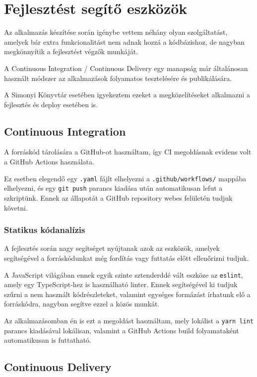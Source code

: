 \chapter{Fejlesztést segítő eszközök}

Az alkalmazás készítése során igénybe vettem néhány olyan szolgáltatást, amelyek bár extra funkcionalitást nem adnak hozzá a kódbázishoz,
de nagyban megkönnyítik a fejlesztést végzők munkáját.

A Continuous Integration / Continuous Delivery egy manapság már általánosan használt módszer az alkalmazások folyamatos tesztelésére és publikálására.

A Simonyi Könyvtár esetében igyekeztem ezeket a megközelítéseket alkalmazni a fejlesztés és deploy esetében is.

\section{Continuous Integration}

A forráskód tárolására a GitHub-ot használtam, így CI megoldásnak evidens volt a GitHub Actions használata.

Ez esetben elegendő egy \lstinline|.yaml| fájlt elhelyezni a \lstinline|.github/workflows/| mappába elhelyezni, és egy \lstinline|git push|
parancs kiadása után automatikusan lefut a szkriptünk. Ennek az állapotát a GitHub repository webes felületén tudjuk követni.

\subsection{Statikus kódanalízis}

A fejlesztés során nagy segítséget nyújtanak azok az eszközök, amelyek segítségével a forráskódunkat még fordítás vagy futtatás
előtt ellenőrizni tudjuk.

A JavaScript világában ennek egyik szinte sztenderddé vált eszköze az \lstinline|eslint|, amely egy TypeScript-hez is használható linter.
Ennek segítségével ki tudjuk szűrni a nem használt kódrészleteket, valamint egységes formázást írhatunk elő a forráskódra, nagyban segítve
ezzel a közös munkát.

Az alkalmazásomban én is ezt a megoldást használtam, mely lokálist a \lstinline|yarn lint| parancs kiadásával lokálisan, valamint
a GitHub Actions build folyamataként automatikusan is futtatható.

\section{Continuous Delivery}

